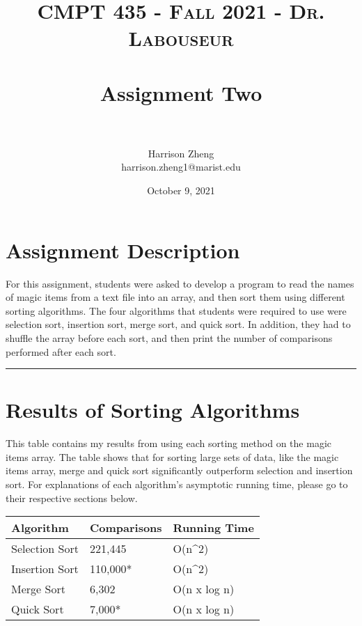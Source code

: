\documentclass[letterpaper, 10pt,DIV=13]{scrartcl}
\title{	
   \normalfont \normalsize 
   \textsc{CMPT 435 - Fall 2021 - Dr. Labouseur} \\[10pt] %
   \horrule{0.5pt} \\[0.25cm] 	%
   \huge Assignment Two  \\     	    %
   \horrule{0.5pt} \\[0.25cm] 	%
}
\author{Harrison Zheng \\ \normalsize harrison.zheng1@marist.edu}
\date{\normalsize October 9, 2021} 	%
\numberwithin{equation}{section} %
\numberwithin{figure}{section} %
\numberwithin{table}{section} %
\newcommand{\horrule}[1]{\rule{\linewidth}{#1}} %
\begin{document}
\maketitle %


\section{Assignment Description}
For this assignment, students were asked to develop a program to read the names of magic items from a text file into an array, and then sort them using different sorting algorithms. The four algorithms that students were required to use were selection sort, insertion sort, merge sort, and quick sort. In addition, they had to shuffle the array before each sort, and then print the number of comparisons performed after each sort.

\horrule{0pt}  	%

\section{Results of Sorting Algorithms}\label{operations}
This table contains my results from using each sorting method on the magic items array. The table shows that for sorting large sets of data, like the magic items array, merge and quick sort significantly outperform selection and insertion sort. For explanations of each algorithm's asymptotic running time, please go to their respective sections below. \\

\begin{center}
\begin{tabular}{ |p{3cm}|p{3cm}|p{3cm}| } 
  \hline
  \textbf{Algorithm} & \textbf{Comparisons} & \textbf{Running Time} \\
  \hline
  Selection Sort & 221,445 & O(n^2) \\ 
  \hline
  Insertion Sort & 110,000* & O(n^2) \\ 
  \hline
  Merge Sort & 6,302 & O(n x log n) \\ 
  \hline
  Quick Sort & 7,000* & O(n x log n) \\ 
  \hline
\end{tabular}
\end{center}
\end{document}
